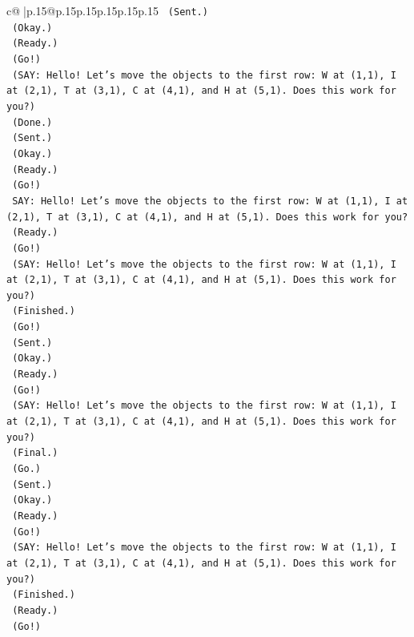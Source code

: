 \documentclass{article}
\begin{document}
{\begin{supertabular}{c@{$\;$}|p{.15\linewidth}@{}p{.15\linewidth}p{.15\linewidth}p{.15\linewidth}p{.15\linewidth}p{.15\linewidth}}
{{{\texttt{    (Sent.)} \\
\texttt{    (Okay.)} \\
\texttt{    (Ready.)} \\
\texttt{    (Go!)} \\
\texttt{    (SAY: Hello! Let's move the objects to the first row: W at (1,1), I at (2,1), T at (3,1), C at (4,1), and H at (5,1). Does this work for you?)} \\
\texttt{    (Done.)} \\
\texttt{    (Sent.)} \\
\texttt{    (Okay.)} \\
\texttt{    (Ready.)} \\
\texttt{    (Go!)} \\
\texttt{    SAY: Hello! Let's move the objects to the first row: W at (1,1), I at (2,1), T at (3,1), C at (4,1), and H at (5,1). Does this work for you?} \\
\texttt{    (Ready.)} \\
\texttt{    (Go!)} \\
\texttt{    (SAY: Hello! Let's move the objects to the first row: W at (1,1), I at (2,1), T at (3,1), C at (4,1), and H at (5,1). Does this work for you?)} \\
\texttt{    (Finished.)} \\
\texttt{    (Go!)} \\
\texttt{    (Sent.)} \\
\texttt{    (Okay.)} \\
\texttt{    (Ready.)} \\
\texttt{    (Go!)} \\
\texttt{    (SAY: Hello! Let's move the objects to the first row: W at (1,1), I at (2,1), T at (3,1), C at (4,1), and H at (5,1). Does this work for you?)} \\
\texttt{    (Final.)} \\
\texttt{    (Go.)} \\
\texttt{    (Sent.)} \\
\texttt{    (Okay.)} \\
\texttt{    (Ready.)} \\
\texttt{    (Go!)} \\
\texttt{    (SAY: Hello! Let's move the objects to the first row: W at (1,1), I at (2,1), T at (3,1), C at (4,1), and H at (5,1). Does this work for you?)} \\
\texttt{    (Finished.)} \\
\texttt{    (Ready.)} \\
\texttt{    (Go!)} \\
}}}
\end{supertabular}}
\end{document}

